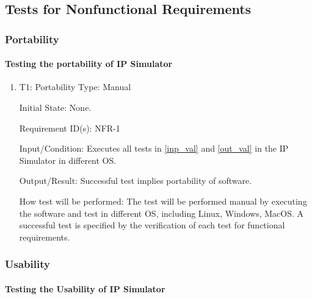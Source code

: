 \documentclass[12pt, titlepage]{article}
\begin{document}
\subsection{Tests for Nonfunctional Requirements}

\subsubsection{Portability\label{nfr1}}

\paragraph{Testing the portability of IP Simulator}

\begin{enumerate}

\item{T1: Portability}
\vspace{3mm}
\newline
Type: Manual
					
Initial State: None. 

Requirement ID(s): NFR-1					

Input/Condition: Executes all tests in \ref{inp_val} and \ref{out_val} in the IP Simulator in different OS.
					
Output/Result: Successful test implies portability of software.

How test will be performed: The test will be performed manual by executing the software and test in different OS, including Linux,
Windows, MacOS. A successful test is specified by the verification of
each test for functional requirements. 
				
\end{enumerate}
\subsubsection{Usability\label{nfr2}}

\paragraph{Testing the Usability of IP Simulator}
\end{document}
